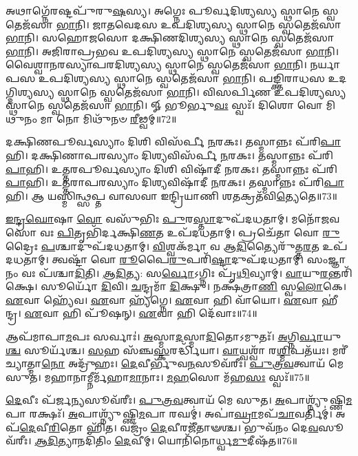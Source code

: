 𑌅𑌥𑌾𑌗𑍍𑌨𑍇᳴𑌰𑌷𑍍𑌟𑌪𑍁᳴𑌰𑍁\-\ul{𑌷}\-𑌸𑍍𑌯। 
𑌅𑌗𑍍𑌨𑍇𑌃 𑌪𑍂𑌰𑍍𑌵𑌦𑌿𑌶𑍍𑌯𑌸𑍍𑌯 𑌸𑍍𑌥𑌾𑌨𑍇 𑌸𑍍𑌵𑌤𑍇𑌜᳴𑌸𑌾 \ul{𑌭𑌾}\-𑌨𑌿। 
𑌜𑌾𑌤𑌵𑍇𑌦𑌸 𑌉𑌪𑌦𑌿𑌶𑍍𑌯𑌸𑍍𑌯 𑌸𑍍𑌥𑌾𑌨𑍇 𑌸𑍍𑌵𑌤𑍇𑌜᳴𑌸𑌾 \ul{𑌭𑌾}\-𑌨𑌿। 
𑌸𑌹𑍋𑌜𑌸𑍋 𑌦𑌕𑍍𑌷𑌿𑌣𑌦𑌿𑌶𑍍𑌯𑌸𑍍𑌯 𑌸𑍍𑌥𑌾𑌨𑍇 𑌸𑍍𑌵𑌤𑍇𑌜᳴𑌸𑌾 \ul{𑌭𑌾}\-𑌨𑌿। 
𑌅𑌜𑌿𑌰𑌾𑌪𑍍𑌰𑌭𑌵 𑌉𑌪𑌦𑌿𑌶𑍍𑌯𑌸𑍍𑌯 𑌸𑍍𑌥𑌾𑌨𑍇 𑌸𑍍𑌵𑌤𑍇𑌜᳴𑌸𑌾 \ul{𑌭𑌾}\-𑌨𑌿। 
𑌵𑍈𑌶𑍍𑌵𑌾𑌨𑌰𑌸𑍍𑌯𑌾𑌪𑌰𑌦𑌿𑌶𑍍𑌯𑌸𑍍𑌯 𑌸𑍍𑌥𑌾𑌨𑍇 𑌸𑍍𑌵𑌤𑍇𑌜᳴𑌸𑌾 \ul{𑌭𑌾}\-𑌨𑌿। 
𑌨𑌰𑍍𑌯𑌾𑌪𑌸 𑌉𑌪𑌦𑌿𑌶𑍍𑌯𑌸𑍍𑌯 𑌸𑍍𑌥𑌾𑌨𑍇 𑌸𑍍𑌵𑌤𑍇𑌜᳴𑌸𑌾 \ul{𑌭𑌾}\-𑌨𑌿। 
𑌪𑌙𑍍𑌕𑍍𑌤𑌿𑌰𑌾𑌧𑌸 𑌉𑌦𑌗𑍍𑌦𑌿𑌶𑍍𑌯𑌸𑍍𑌯 𑌸𑍍𑌥𑌾𑌨𑍇 𑌸𑍍𑌵𑌤𑍇𑌜᳴𑌸𑌾 \ul{𑌭𑌾}\-𑌨𑌿। 
𑌵𑌿𑌸𑌰𑍍𑌪𑌿𑌣 𑌉𑌪𑌦𑌿𑌶𑍍𑌯𑌸𑍍𑌯 𑌸𑍍𑌥𑌾𑌨𑍇 𑌸𑍍𑌵𑌤𑍇𑌜᳴𑌸𑌾 \ul{𑌭𑌾}\-𑌨𑌿। 
𑍐 𑌭𑍂𑌰𑍍𑌭𑍁\-\ul{𑌵𑌃} 𑌸𑍍𑌵𑌃᳴। 𑌦𑌿𑌶𑍋 𑌵𑍋 𑌮𑌿𑌥𑍁𑌨𑌂 𑌮𑌾 𑌨𑍋 𑌮𑌿𑌥𑍁᳴𑌨𑍞 \ul{𑌰𑍀}\-𑌢𑍍𑌵𑌮𑍍॥72॥\anuvakamend


𑌦𑌕𑍍𑌷𑌿𑌣𑌪𑍂𑌰𑍍𑌵𑌸𑍍𑌯𑌾𑌂 𑌦𑌿𑌶𑌿 𑌵𑌿𑌸᳴𑌰𑍍𑌪𑍀 \ul{𑌨}\-𑌰𑌕𑌃। 𑌤𑌸𑍍𑌮𑌾𑌨𑍍𑌨𑌃 𑌪᳴𑌰𑌿\-\ul{𑌪𑌾}\-𑌹𑌿। 
𑌦𑌕𑍍𑌷𑌿𑌣𑌾𑌪𑌰𑌸𑍍𑌯𑌾𑌂 𑌦𑌿𑌶𑍍𑌯𑌵𑌿𑌸᳴𑌰𑍍𑌪𑍀 \ul{𑌨}\-𑌰𑌕𑌃। 𑌤𑌸𑍍𑌮𑌾𑌨𑍍𑌨𑌃 𑌪᳴𑌰𑌿\-\ul{𑌪𑌾}\-𑌹𑌿। 
𑌉𑌤𑍍𑌤𑌰𑌪𑍂𑌰𑍍𑌵𑌸𑍍𑌯𑌾𑌂 𑌦𑌿𑌶𑌿 𑌵𑌿𑌷𑌾᳴𑌦𑍀 \ul{𑌨}\-𑌰𑌕𑌃। 𑌤𑌸𑍍𑌮𑌾𑌨𑍍𑌨𑌃 𑌪᳴𑌰𑌿\-\ul{𑌪𑌾}\-𑌹𑌿। 
𑌉𑌤𑍍𑌤𑌰𑌾𑌪𑌰𑌸𑍍𑌯𑌾𑌂 𑌦𑌿𑌶𑍍𑌯𑌵𑌿𑌷𑌾᳴𑌦𑍀 \ul{𑌨}\-𑌰𑌕𑌃। 𑌤𑌸𑍍𑌮𑌾𑌨𑍍𑌨𑌃 𑌪᳴𑌰𑌿\-\ul{𑌪𑌾}\-𑌹𑌿। 
𑌆 𑌯𑌸𑍍𑌮𑌿𑌨𑍍𑌥𑍍𑌸𑌪𑍍𑌤 𑌵𑌾𑌸𑌵𑌾 𑌇𑌨𑍍𑌦𑍍𑌰𑌿𑌯𑌾𑌣𑌿 𑌶𑌤𑌕𑍍𑌰𑌤᳴𑌵𑌿\-\ul{𑌤𑍍𑌯𑍇}\-𑌤𑍇॥73॥\anuvakamend


\-\ul{𑌇}\-\-\ul{𑌨𑍍𑌦𑍍𑌰}\-\-\ul{𑌘𑍋}\-𑌷𑌾 \ul{𑌵𑍋} 𑌵𑌸𑍁᳴𑌭𑌿𑌃 \ul{𑌪𑍁}\-𑌰\-\ul{𑌸𑍍𑌤𑌾}\-𑌦𑍁𑌪᳴𑌦𑌧𑌤𑌾𑌮𑍍। 
𑌮𑌨𑍋᳴𑌜𑌵𑌸𑍋 𑌵𑌃 \ul{𑌪𑌿}\-𑌤𑍃𑌭𑌿᳴𑌰𑍍𑌦𑌕𑍍𑌷𑌿\-\ul{𑌣}\-𑌤 𑌉𑌪᳴𑌦𑌧𑌤𑌾𑌮𑍍। 
𑌪𑍍𑌰𑌚𑍇᳴𑌤𑌾 𑌵𑍋 \ul{𑌰𑍁}\-𑌦𑍍𑌰𑍈𑌃 \ul{𑌪}\-𑌶𑍍𑌚𑌾𑌦𑍁𑌪᳴𑌦𑌧𑌤𑌾𑌮𑍍। 
\-\ul{𑌵𑌿}\-𑌶𑍍𑌵𑌕᳴𑌰𑍍𑌮𑌾 𑌵 𑌆\-\ul{𑌦𑌿}\-𑌤𑍍𑌯𑍈𑌰𑍁᳴𑌤𑍍𑌤\-\ul{𑌰}\-𑌤 𑌉𑌪᳴𑌦𑌧𑌤𑌾𑌮𑍍। 
𑌤𑍍𑌵𑌷𑍍𑌟𑌾᳴ 𑌵𑍋 \ul{𑌰𑍂}\-𑌪𑍈\-\ul{𑌰𑍁}\-𑌪𑌰𑌿᳴\-\ul{𑌷𑍍𑌟𑌾}\-𑌦𑍁𑌪᳴\-𑌦𑌧𑌤𑌾𑌮𑍍। 
𑌸𑌂𑌜𑍍𑌞𑌾𑌨𑌂 𑌵𑌃 𑌪᳴𑌶𑍍𑌚𑌾\-\ul{𑌦𑌿}\-𑌤𑌿। \ul{𑌆}\-\-\ul{𑌦𑌿}\-𑌤𑍍𑌯: 𑌸\-\ul{𑌰𑍍𑌵𑍋}\-𑌽𑌗𑍍𑌨𑌿𑌃 𑌪𑍃᳴\-\ul{𑌥𑌿}\-𑌵𑍍𑌯𑌾𑌮𑍍। 
\-\ul{𑌵𑌾}\-𑌯𑍁\-\ul{𑌰}\-𑌨𑍍𑌤𑌰𑌿᳴𑌕𑍍𑌷𑍇। 𑌸𑍂𑌰𑍍𑌯𑍋᳴ \ul{𑌦𑌿}\-𑌵𑌿। \ul{𑌚}\-𑌨𑍍𑌦𑍍𑌰𑌮𑌾᳴ \ul{𑌦𑌿}\-𑌕𑍍𑌷𑍁। 
𑌨𑌕𑍍𑌷᳴𑌤𑍍𑌰𑌾\-\ul{𑌣𑌿} 𑌸𑍍𑌵\-\ul{𑌲𑍋}\-𑌕𑍇। \ul{𑌏}\-𑌵𑌾 𑌹𑍍𑌯𑍇᳴𑌵। \ul{𑌏}\-𑌵𑌾 𑌹𑍍𑌯᳴𑌗𑍍𑌨𑍇। 
\-\ul{𑌏}\-𑌵𑌾 𑌹𑌿 𑌵𑌾᳴𑌯𑍋। \ul{𑌏}\-𑌵𑌾 𑌹𑍀॑𑌨𑍍𑌦𑍍𑌰। \ul{𑌏}\-𑌵𑌾 𑌹𑌿 𑌪𑍂᳴𑌷𑌨𑍍। \ul{𑌏}\-𑌵𑌾 𑌹𑌿 𑌦𑍇᳴𑌵𑌾𑌃॥74॥\anuvakamend


𑌆𑌪᳴𑌮𑌾𑌪𑌾\-\ul{𑌮}\-𑌪𑌃 𑌸𑌰𑍍𑌵𑌾𑌃॑। \ul{𑌅}\-𑌸𑍍𑌮𑌾\-\ul{𑌦}\-𑌸𑍍𑌮𑌾\-\ul{𑌦𑌿}\-𑌤𑍋𑌽𑌮𑍁𑌤𑌃᳴।
\-\ul{𑌅}\-𑌗𑍍𑌨𑌿\-\ul{𑌰𑍍𑌵𑌾}\-𑌯𑍁\-\ul{𑌶𑍍𑌚} 𑌸𑍂𑌰𑍍𑌯᳴𑌶𑍍𑌚। \ul{𑌸}\-𑌹 𑌸᳴𑌞𑍍𑌚\-\ul{𑌸𑍍𑌕}\-𑌰𑌰𑍍𑌦𑍍𑌧𑌿᳴𑌯𑌾। 
\-\ul{𑌵𑌾}\-𑌯𑍍𑌵𑌶𑍍𑌵𑌾᳴ 𑌰\-\ul{𑌶𑍍𑌮𑌿}\-𑌪𑌤᳴𑌯𑌃। 𑌮𑌰𑍀॑𑌚𑍍𑌯𑌾𑌤𑍍𑌮𑌾\-\ul{𑌨𑍋} 𑌅𑌦𑍍𑌰𑍁᳴𑌹𑌃। 
\-\ul{𑌦𑍇}\-𑌵𑍀𑌰𑍍𑌭𑍁᳴𑌵\-\ul{𑌨}\-𑌸𑍂𑌵᳴𑌰𑍀𑌃। \ul{𑌪𑍁}\-\-\ul{𑌤𑍍𑌰}\-\-\ul{𑌵}\-𑌤𑍍𑌵𑌾𑌯᳴ 𑌮𑍇 𑌸𑍁𑌤। 
𑌮𑌹𑌾𑌨𑌾𑌮𑍍𑌨𑍀𑌰𑍍𑌮᳴𑌹𑌾\-\ul{𑌮𑌾}\-𑌨𑌾𑌃। \ul{𑌮}\-\-\ul{𑌹}\-𑌸𑍋 𑌮᳴𑌹\-\ul{𑌸𑌃} 𑌸𑍍𑌵𑌃᳴॥75॥


\-\ul{𑌦𑍇}\-𑌵𑍀𑌃 𑌪᳴𑌰𑍍𑌜\-\ul{𑌨𑍍𑌯}\-𑌸𑍂𑌵᳴𑌰𑍀𑌃। \ul{𑌪𑍁}\-\-\ul{𑌤𑍍𑌰}\-\-\ul{𑌵}\-𑌤𑍍𑌵𑌾𑌯᳴ 𑌮𑍇 𑌸𑍁𑌤। 
\-\ul{𑌅}\-𑌪𑌾𑌶𑍍𑌨𑍍𑌯𑍁᳴𑌷𑍍𑌣𑌿\-\ul{𑌮}\-𑌪𑌾 𑌰𑌕𑍍𑌷𑌃᳴। \ul{𑌅}\-𑌪𑌾𑌶𑍍𑌨𑍍𑌯𑍁᳴𑌷𑍍𑌣𑌿\-\-\ul{𑌮}\-𑌪𑌾 𑌰𑌘𑌮𑍍॑। 
𑌅𑌪𑌾॑\-\ul{𑌘𑍍𑌰𑌾}\-𑌮𑌪᳴\-\ul{𑌚𑌾}\-𑌵𑌰𑍍𑌤𑌿𑌮𑍍॑। 𑌅𑌪᳴\-\ul{𑌦𑍇}\-𑌵𑍀\-\ul{𑌰𑌿}\-𑌤𑍋 𑌹𑌿᳴𑌤। 
𑌵𑌜𑍍𑌰𑌂᳴ \ul{𑌦𑍇}\-𑌵𑍀𑌰𑌜𑍀᳴𑌤𑌾𑍟𑌶𑍍𑌚। 𑌭𑍁𑌵᳴𑌨𑌂 𑌦𑍇\-\ul{𑌵}\-𑌸𑍂𑌵᳴𑌰𑍀𑌃। 
\-\ul{𑌆}\-\-\ul{𑌦𑌿}\-𑌤𑍍𑌯𑌾𑌨𑌦𑌿᳴𑌤𑌿𑌂 \ul{𑌦𑍇}\-𑌵𑍀𑌮𑍍। 𑌯𑍋𑌨𑌿᳴𑌨𑍋𑌰𑍍𑌧𑍍𑌵\-\ul{𑌮𑍁}\-𑌦𑍀𑌷᳴𑌤॥76॥



